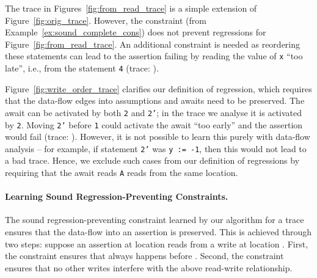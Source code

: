 \documentclass{llncs}
\newcommand\comment[1]{}
\begin{document}
\begin{example}
  \label{ex:non_locality}
  The trace in Figures~\ref{fig:from_read_trace} is a simple extension
  of Figure~\ref{fig:orig_trace}.
  However, the constraint 
  (from Example~\ref{ex:sound_complete_cons}) does not prevent
  regressions for Figure~\ref{fig:from_read_trace}.
  An additional constraint  is needed as
  reordering these statements can lead to the assertion failing by
  reading the value of {\tt x} ``too late'', i.e., from the statement
  {\tt 4} (trace: ).
  
  Figure~\ref{fig:write_order_trace} clarifies our definition of
  regression, which requires that the data-flow edges into
  assumptions and awaits need to be preserved.
  The await can be activated by both {\tt 2} and {\tt 2'}; in the trace
  we analyse it is activated by {\tt 2}.
  Moving {\tt 2'} before {\tt 1} could activate the await ``too early''
  and the assertion would fail (trace: ).
  However, it is not possible to learn this purely with data-flow
  analysis -- for example, if statement {\tt 2'} was {\tt y := -1}, then
  this would not lead to a bad trace.
  Hence, we exclude such cases from our definition of regressions by
  requiring that the await reads {\tt A} reads from the same location.
\end{example}



\comment{
\begin{example}[Problems for over-approximation]
  Consider the modified version of the trace in
  Figure~\ref{fig:over_approx_trace}.
  Here, the constraint  is too strong, i.e., there are programs
  that violate the constraint and yet do not introduce regressions.
  The problem here is that the assertion may succeed even if the current
  version of the data-flow into the assertion is not respected -- even
  if the assertion reads the value of {\tt x} too early, i.e., from {\tt
  0'}, the assertion still succeeds.
\end{example}
}

\paragraph{Learning Sound Regression-Preventing Constraints.}
The sound regression-preventing constraint learned by our algorithm for
a trace ensures that the data-flow into an assertion is preserved.
This is achieved through two steps: suppose an assertion at location
 reads from a write at location . 
First, the constraint ensures that  always happens before
.
Second, the constraint ensures that no other writes 
interfere with the above read-write relationship.
\end{document}
